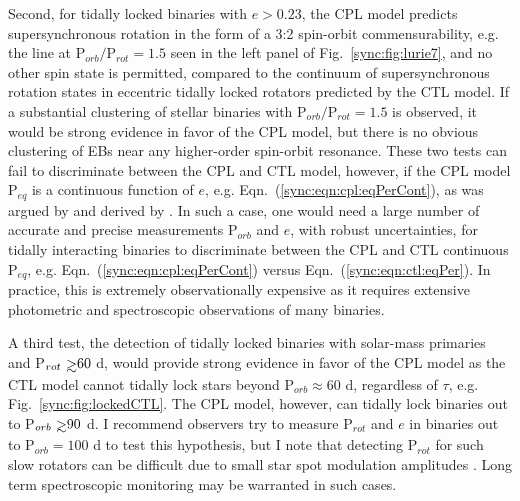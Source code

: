 Second, for tidally locked binaries with $e > 0.23$, the CPL model predicts supersynchronous rotation in the form of a 3:2 spin-orbit commensurability, e.g. the line at P$_{orb}/$P$_{rot} = 1.5$ seen in the left panel of Fig.~\ref{sync:fig:lurie7}, and no other spin state is permitted, compared to the continuum of supersynchronous rotation states in eccentric tidally locked rotators predicted by the CTL model. If a substantial clustering of stellar binaries with P$_{orb}/$P$_{rot} = 1.5$ is observed, it would be strong evidence in favor of the CPL model, but there is no obvious clustering of \kepler EBs near any higher-order spin-orbit resonance. These two tests can fail to discriminate between the CPL and CTL model, however, if the CPL model P$_{eq}$ is a continuous function of $e$, e.g. Eqn.~(\ref{sync:eqn:cpl:eqPerCont}), as was argued by \citet{Goldreich1966b} and derived by \citet{Murray1999}.  In such a case, one would need a large number of accurate and precise measurements P$_{orb}$ and $e$, with robust uncertainties, for tidally interacting binaries to discriminate between the CPL and CTL continuous P$_{eq}$, e.g. Eqn.~(\ref{sync:eqn:cpl:eqPerCont}) versus Eqn.~(\ref{sync:eqn:ctl:eqPer}).  In practice, this is extremely observationally expensive as it requires extensive photometric and spectroscopic observations of many binaries. 

A third test, the detection of tidally locked binaries with solar-mass primaries and P$_{rot} \gsim 60$ d, would provide strong evidence in favor of the CPL model as the CTL model cannot tidally lock stars beyond P$_{orb} \approx 60$ d, regardless of $\tau$, e.g. Fig.~\ref{sync:fig:lockedCTL}. The CPL model, however, can tidally lock binaries out to P$_{orb} \gsim 90$ d.  I recommend observers try to measure P$_{rot}$ and $e$ in binaries out to P$_{orb} = 100 $ d to test this hypothesis, but I note that detecting P$_{rot}$ for such slow rotators can be difficult due to small star spot modulation amplitudes \citep{McQuillan2014,Lurie2017,Reinhold2018}. Long term spectroscopic monitoring may be warranted in such cases.

